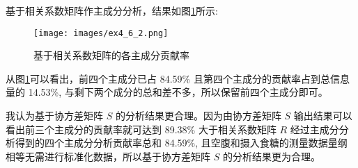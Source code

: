 \documentclass{ctexrep}
\begin{document}
基于相关系数矩阵作主成分分析，结果如图\ref{fig:ex462}所示:
\begin{figure}[h!]
\begin{center}
\texttt{[image: images/ex4\_6\_2.png]}
\end{center}
\caption{基于相关系数矩阵的各主成分贡献率}
\label{fig:ex462}
\end{figure}

从图\ref{fig:ex462}可以看出，前四个主成分已占 84.59\% 且第四个主成分的贡献率占到总信息量的 14.53\%, 与剩下两个成分的总和差不多，所以保留前四个主成分即可。

我认为基于协方差矩阵 $S$ 的分析结果更合理。因为由协方差矩阵 $S$ 输出结果可以看出前三个主成分的贡献率就可达到 89.38\% 大于相关系数矩阵 $R$ 经过主成分分析得到的四个主成分分析贡献率总和 84.59\%, 且空腹和摄入食糖的测量数据量纲相等无需进行标准化数据，所以基于协方差矩阵 $S$ 的分析结果更为合理。
\end{document}
